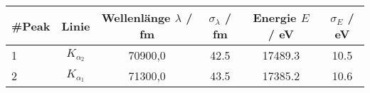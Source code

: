 \begin{tabular}{lcSSSS}
\toprule
\#Peak & Linie & {Wellenlänge $\lambda$ / \si{\femto\metre}} & {$\sigma_{\lambda}$ / \si{\femto\metre}} & {Energie $E$ / \si{\electronvolt}} & {$\sigma_E$ / \si{\electronvolt}} \\
	& $K_{\alpha_2}$	& 70900,0	& 42.5	& 17489.3	& 10.5 \\
2	& $K_{\alpha_1}$	& 71300,0	& 43.5	& 17385.2	& 10.6 \\
\bottomrule
\end{tabular}